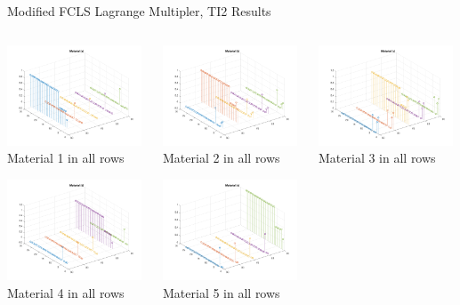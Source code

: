 \documentclass{beamer}
\begin{document}
\begin{frame}{Modified FCLS Lagrange Multipler, TI2 Results}
\begin{columns}
    \begin{column}{0.33\textwidth}
        \includegraphics[width=4cm,center]{mfcls2_ti2_material_stem_1}
        \\ Material 1 in all rows
        \centering

        \includegraphics[width=4cm,center]{mfcls2_ti2_material_stem_4}
        \\ Material 4 in all rows
        \centering
    \end{column}
    \begin{column}{0.33\textwidth}
        \includegraphics[width=4cm,center]{mfcls2_ti2_material_stem_2}
        \\ Material 2 in all rows
        \centering

        \includegraphics[width=4cm,center]{mfcls2_ti2_material_stem_5}
        \\ Material 5 in all rows
        \centering
    \end{column}
    \begin{column}{0.33\textwidth}
        \includegraphics[width=4cm,center]{mfcls2_ti2_material_stem_3}
        \\ Material 3 in all rows
        \centering


\end{column}
\end{columns}
\end{frame}
\end{document}
